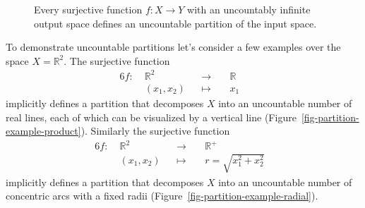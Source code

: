 \documentclass[
  letterpaper,
  DIV=11,
  numbers=noendperiod]{scrartcl}
\begin{document}
\begin{figure}


\caption{\label{fig-continuous-partition}Every surjective function
\(f : X \rightarrow Y\) with an uncountably infinite output space
defines an uncountable partition of the input space.}

\end{figure}%

To demonstrate uncountable partitions let's consider a few examples over
the space \(X = \mathbb{R}^{2}\). The surjective function
\begin{alignat*}{6}
f :\; &\mathbb{R}^{2}& &\rightarrow& \; &\mathbb{R}&
\\
&(x_{1}, x_{2})& &\mapsto& &x_{1}&
\end{alignat*} implicitly defines a partition that decomposes \(X\) into
an uncountable number of real lines, each of which can be visualized by
a vertical line (Figure~\ref{fig-partition-example-product}). Similarly
the surjective function \begin{alignat*}{6}
f :\; &\mathbb{R}^{2}& &\rightarrow& \; &\mathbb{R}^{+}&
\\
&(x_{1}, x_{2})& &\mapsto& &r = \sqrt{x_{1}^{2} + x_{2}^{2}}&
\end{alignat*} implicitly defines a partition that decomposes \(X\) into
an uncountable number of concentric arcs with a fixed radii
(Figure~\ref{fig-partition-example-radial}).
\end{document}
